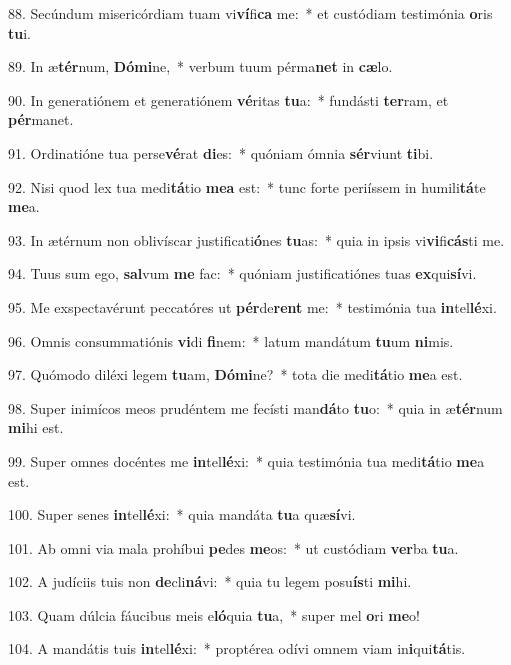 88. Secúndum misericórdiam tuam vi\textbf{ví}fi\textbf{ca} me:~*  et custódiam testimónia \textbf{o}ris \textbf{tu}i.\

89. In æ\textbf{tér}num, \textbf{Dó}\textbf{mi}ne,~*  verbum tuum pérma\textbf{net} in \textbf{cæ}lo.\

90. In generatiónem et generatiónem \textbf{vé}ritas \textbf{tu}a:~*  fundásti \textbf{ter}ram, et \textbf{pér}manet.\

91. Ordinatióne tua perse\textbf{vé}rat \textbf{di}es:~*  quóniam ómnia \textbf{sér}viunt \textbf{ti}bi.\

92. Nisi quod lex tua medi\textbf{tá}tio \textbf{me}\textbf{a} est:~*  tunc forte periíssem in humili\textbf{tá}te \textbf{me}a.\

93. In ætérnum non oblivíscar justificati\textbf{ó}nes \textbf{tu}as:~*  quia in ipsis vi\textbf{vi}fi\textbf{cás}ti me.\

94. Tuus sum ego, \textbf{sal}vum \textbf{me} fac:~*  quóniam justificatiónes tuas \textbf{ex}qui\textbf{sí}vi.\

95. Me exspectavérunt peccatóres ut \textbf{pér}de\textbf{rent} me:~*  testimónia tua \textbf{in}tel\textbf{lé}xi.\

96. Omnis consummatiónis \textbf{vi}di \textbf{fi}nem:~*  latum mandátum \textbf{tu}um \textbf{ni}mis.\

97. Quómodo diléxi legem \textbf{tu}am, \textbf{Dó}\textbf{mi}ne?~*  tota die medi\textbf{tá}tio \textbf{me}a est.\

98. Super inimícos meos prudéntem me fecísti man\textbf{dá}to \textbf{tu}o:~*  quia in æ\textbf{tér}num \textbf{mi}hi est.\

99. Super omnes docéntes me \textbf{in}tel\textbf{lé}xi:~*  quia testimónia tua medi\textbf{tá}tio \textbf{me}a est.\

100. Super senes \textbf{in}tel\textbf{lé}xi:~*  quia mandáta \textbf{tu}a quæ\textbf{sí}vi.\

101. Ab omni via mala prohíbui \textbf{pe}des \textbf{me}os:~*  ut custódiam \textbf{ver}ba \textbf{tu}a.\

102. A judíciis tuis non \textbf{de}cli\textbf{ná}vi:~*  quia tu legem posu\textbf{ís}ti \textbf{mi}hi.\

103. Quam dúlcia fáucibus meis e\textbf{ló}quia \textbf{tu}a,~*  super mel \textbf{o}ri \textbf{me}o!\

104. A mandátis tuis \textbf{in}tel\textbf{lé}xi:~*  proptérea odívi omnem viam in\textbf{i}qui\textbf{tá}tis.\

